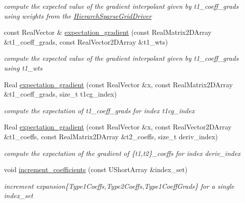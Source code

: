 \begin{DoxyCompactItemize}
\begin{DoxyCompactList}\small\item\em compute the expected value of the gradient interpolant given by t1\+\_\+coeff\+\_\+grads using weights from the \hyperlink{classPecos_1_1HierarchSparseGridDriver}{Hierarch\+Sparse\+Grid\+Driver} \end{DoxyCompactList}\item 
const Real\+Vector \& \hyperlink{classPecos_1_1HierarchInterpPolyApproximation_af7cb170e68ec826d583313ef224f47a0}{expectation\+\_\+gradient} (const Real\+Matrix2\+D\+Array \&t1\+\_\+coeff\+\_\+grads, const Real\+Vector2\+D\+Array \&t1\+\_\+wts)
\begin{DoxyCompactList}\small\item\em compute the expected value of the gradient interpolant given by t1\+\_\+coeff\+\_\+grads using t1\+\_\+wts \end{DoxyCompactList}\item 
Real \hyperlink{classPecos_1_1HierarchInterpPolyApproximation_a6e2bc30784df7fe2c7c058f55376a0a4}{expectation\+\_\+gradient} (const Real\+Vector \&x, const Real\+Matrix2\+D\+Array \&t1\+\_\+coeff\+\_\+grads, size\+\_\+t t1cg\+\_\+index)
\begin{DoxyCompactList}\small\item\em compute the expectation of t1\+\_\+coeff\+\_\+grads for index t1cg\+\_\+index \end{DoxyCompactList}\item 
Real \hyperlink{classPecos_1_1HierarchInterpPolyApproximation_ab1ddf31383c7e516aeb07b80339ec461}{expectation\+\_\+gradient} (const Real\+Vector \&x, const Real\+Vector2\+D\+Array \&t1\+\_\+coeffs, const Real\+Matrix2\+D\+Array \&t2\+\_\+coeffs, size\+\_\+t deriv\+\_\+index)
\begin{DoxyCompactList}\small\item\em compute the expectation of the gradient of \{t1,t2\}\+\_\+coeffs for index deriv\+\_\+index \end{DoxyCompactList}\item 
void \hyperlink{classPecos_1_1HierarchInterpPolyApproximation_a9403f7c8e5fbfdb4b2142b088673c533}{increment\+\_\+coefficients} (const U\+Short\+Array \&index\+\_\+set)
\begin{DoxyCompactList}\small\item\em increment expansion\{Type1\+Coeffs,Type2\+Coeffs,Type1\+Coeff\+Grads\} for a single index\+\_\+set \end{DoxyCompactList}\item 

\end{DoxyCompactItemize}
